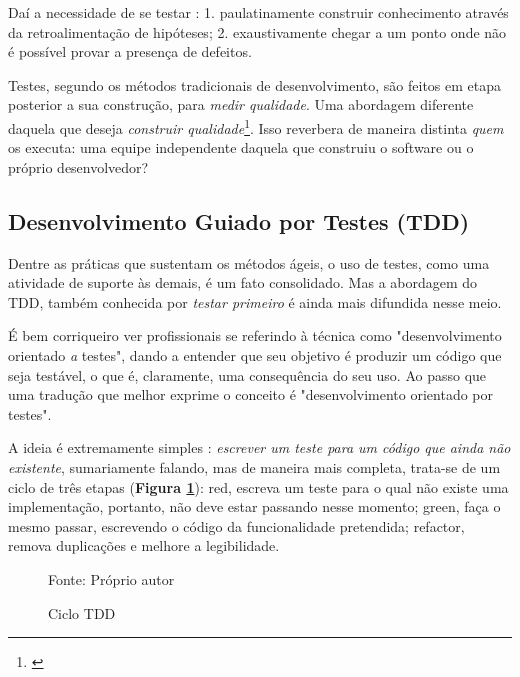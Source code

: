     Daí a necessidade de se testar \cite[pág. xxix-xxx]{Mezaros2007}: 1.
    paulatinamente construir conhecimento através da retroalimentação de
    hipóteses; 2. exaustivamente chegar a um ponto onde não é possível provar a
    presença de defeitos.

    Testes, segundo os métodos tradicionais de desenvolvimento, são feitos em
    etapa posterior a sua construção, para \emph{medir qualidade}. Uma abordagem
    diferente daquela que deseja \emph{construir qualidade}\footnote{
    \cite[pág. 7]{FarcicGarcia2015}}. Isso reverbera de maneira distinta
    \emph{quem} os executa: uma equipe independente daquela que construiu o
    software ou o próprio desenvolvedor?


    \subsection{Desenvolvimento Guiado por Testes (TDD)}

      Dentre as práticas que sustentam os métodos ágeis, o uso de testes, como
      uma atividade de suporte às demais, é um fato consolidado. Mas a abordagem
      do TDD, também conhecida por \emph{testar primeiro} é ainda mais difundida
      nesse  meio.

      É bem corriqueiro ver profissionais se referindo à  técnica como
      "desenvolvimento orientado \emph{a} testes", dando a entender que seu
      objetivo é produzir um código que seja testável, o que é, claramente, uma
      consequência do seu uso. Ao passo que uma tradução que melhor exprime o
      conceito é "desenvolvimento orientado {por} testes".

      A ideia é extremamente simples \cite[p.1]{FreemanPryce2009}: \emph{escrever um
      teste para um código que ainda não existente}, sumariamente falando, mas
      de maneira mais completa, trata-se de um ciclo de três etapas\cite[pág. x]
      {Beck2003} (\textbf{Figura \ref{fig:ciclo-tdd}}): red,  escreva um teste
      para o qual não existe uma implementação, portanto, não deve estar
      passando nesse momento; green, faça o mesmo passar, escrevendo o código da
      funcionalidade pretendida; refactor, remova duplicações e melhore a
      legibilidade.

      \begin{figure}[h!]
        \centering
        \caption{Ciclo TDD}
        Fonte: Próprio autor\footnotemark
        \label{fig:ciclo-tdd}
      \end{figure}

